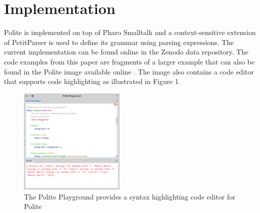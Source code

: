 
\section{Implementation}
Polite is implemented on top of Pharo Smalltalk and a context-sensitive extension of PetitParser is used to define its grammar using parsing expressions\cite{Kurs14a-ParsingContext}. The current implementation can be found online in the Zenodo data repository. The code examples from this paper are fragments of a larger example that can also be found in the Polite image available online \cite{kurs16-polite}. The image also contains a code editor that supports code highlighting as illustrated in Figure 1.

\begin{figure}[h]
	\centering
	\includegraphics[width=0.45\textwidth]{images/playground.png}
	\caption{The Polite Playground provides a syntax highlighting code editor for Polite}
	\label{fig:figure1}
\end{figure}